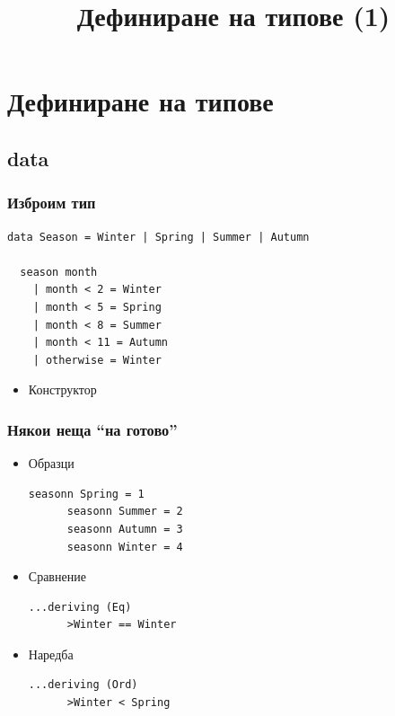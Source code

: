\documentclass{beamer}
\begin{document}
\title[Типове]{Дефиниране на типове (1)}
\frame{\titlepage}

\section{Дефиниране на типове}
\subsection{data}


\begin{frame}[fragile]
  \frametitle{Изброим тип}

\begin{lstlisting}[basicstyle=\small]
  data Season = Winter | Spring | Summer | Autumn

  season month
    | month < 2 = Winter
    | month < 5 = Spring
    | month < 8 = Summer
    | month < 11 = Autumn
    | otherwise = Winter
\end{lstlisting}

\begin{itemize}
  \item Конструктор
\end{itemize}

\end{frame}

\begin{frame}[fragile]
  \frametitle{Някои неща ``на готово''}

\begin{itemize}
  \item Образци
  \begin{lstlisting}[basicstyle=\small]
      seasonn Spring = 1
      seasonn Summer = 2
      seasonn Autumn = 3
      seasonn Winter = 4
  \end{lstlisting}
  \item Сравнение
  \begin{lstlisting}[basicstyle=\small]
      ...deriving (Eq)
      >Winter == Winter
  \end{lstlisting}
  \item Наредба
  \begin{lstlisting}[basicstyle=\small]
      ...deriving (Ord)
      >Winter < Spring
  \end{lstlisting}
\end{itemize}

\end{frame}
\end{document}

